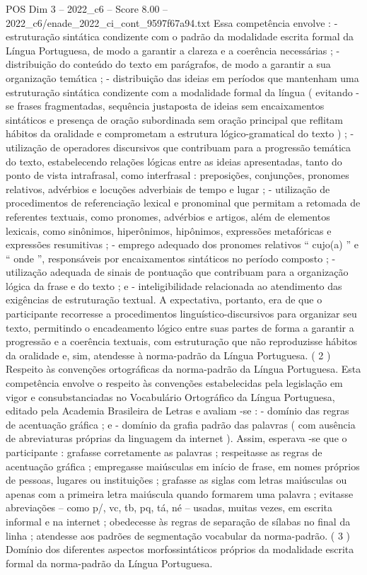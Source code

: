 \begin{textsample}{POS Dim 3 – 2022\_c6 – Score 8.00 – 2022\_c6/enade\_2022\_ci\_cont\_9597f67a94.txt}
Essa competência envolve : - estruturação sintática condizente com o padrão da modalidade escrita formal da Língua Portuguesa, de modo a garantir a clareza e a coerência necessárias ; - distribuição do conteúdo do texto em parágrafos, de modo a garantir a sua organização temática ; - distribuição das ideias em períodos que mantenham uma estruturação sintática condizente com a modalidade formal da língua ( evitando -se frases fragmentadas, sequência justaposta de ideias sem encaixamentos sintáticos e presença de oração subordinada sem oração principal que reflitam hábitos da oralidade e comprometam a estrutura lógico-gramatical do texto ) ; - utilização de operadores discursivos que contribuam para a progressão temática do texto, estabelecendo relações lógicas entre as ideias apresentadas, tanto do ponto de vista intrafrasal, como interfrasal : preposições, conjunções, pronomes relativos, advérbios e locuções adverbiais de tempo e lugar ; - utilização de procedimentos de referenciação lexical e pronominal que permitam a retomada de referentes textuais, como pronomes, advérbios e artigos, além de elementos lexicais, como sinônimos, hiperônimos, hipônimos, expressões metafóricas e expressões resumitivas ; - emprego adequado dos pronomes relativos “ cujo(a) ” e “ onde ”, responsáveis por encaixamentos sintáticos no período composto ; - utilização adequada de sinais de pontuação que contribuam para a organização lógica da frase e do texto ; e - inteligibilidade relacionada ao atendimento das exigências de estruturação textual.
A expectativa, portanto, era de que o participante recorresse a procedimentos linguístico-discursivos para organizar seu texto, permitindo o encadeamento lógico entre suas partes de forma a garantir a progressão e a coerência textuais, com estruturação que não reproduzisse hábitos da oralidade e, sim, atendesse à norma-padrão da Língua Portuguesa. ( 2 ) Respeito às convenções ortográficas da norma-padrão da Língua Portuguesa.
Esta competência envolve o respeito às convenções estabelecidas pela legislação em vigor e consubstanciadas no Vocabulário Ortográfico da Língua Portuguesa, editado pela Academia Brasileira de Letras e avaliam -se : - domínio das regras de acentuação gráfica ; e - domínio da grafia padrão das palavras ( com ausência de abreviaturas próprias da linguagem da internet ).
Assim, esperava -se que o participante : grafasse corretamente as palavras ; respeitasse as regras de acentuação gráfica ; empregasse maiúsculas em início de frase, em nomes próprios de pessoas, lugares ou instituições ; grafasse as siglas com letras maiúsculas ou apenas com a primeira letra maiúscula quando formarem uma palavra ; evitasse abreviações – como p/, vc, tb, pq, tá, né – usadas, muitas vezes, em escrita informal e na internet ; obedecesse às regras de separação de sílabas no final da linha ; atendesse aos padrões de segmentação vocabular da norma-padrão. ( 3 ) Domínio dos diferentes aspectos morfossintáticos próprios da modalidade escrita formal da norma-padrão da Língua Portuguesa.

\end{textsample}
